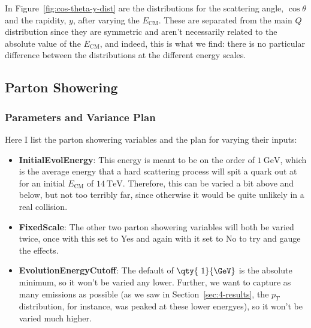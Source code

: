 In Figure~\ref{fig:cos-theta-y-dist} are the distributions for the scattering angle, $\cos\theta$ and the rapidity, $y$, after varying the $E_{\mathrm{CM}}$. These are separated from the main $Q$ distribution since they are symmetric and aren't necessarily related to the absolute value of the $E_{\mathrm{CM}}$, and indeed, this is what we find: there is no particular difference between the distributions at the different energy scales.

\subsection{Parton Showering}

\subsubsection{Parameters and Variance Plan}

Here I list the parton showering variables and the plan for varying their inputs:

\begin{itemize}
\item \textbf{InitialEvolEnergy}: This energy is meant to be on the order of $\qty{1}{\GeV}$, which is the average energy that a hard scattering process will spit a quark out at for an initial $E_{\mathrm{CM}}$ of $\qty{14}{\TeV}$. Therefore, this can be varied a bit above and below, but not too terribly far, since otherwise it would be quite unlikely in a real collision.
\item \textbf{FixedScale}: The other two parton showering variables will both be varied twice, once with this set to Yes and again with it set to No to try and gauge the effects.
\item \textbf{EvolutionEnergyCutoff}: The default of $\qty{~1}{\GeV}$ is the absolute minimum, so it won't be varied any lower. Further, we want to capture as many emissions as possible (as we saw in Section~\ref{sec:4-results}, the $p_T$ distribution, for instance, was peaked at these lower energyes), so it won't be varied much higher.
\end{itemize}


